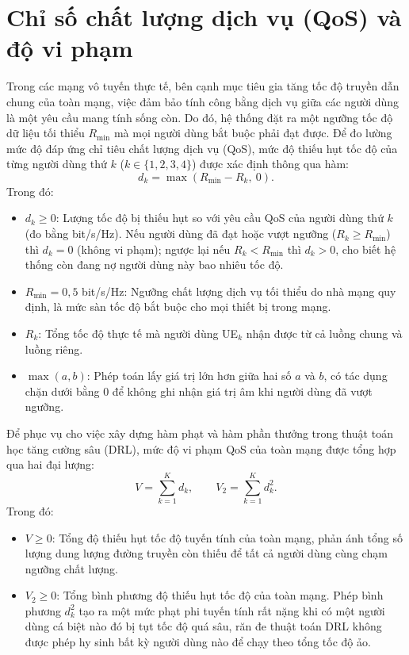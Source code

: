 \section{Chỉ số chất lượng dịch vụ (QoS) và độ vi phạm}
\label{sec:qos}

Trong các mạng vô tuyến thực tế, bên cạnh mục tiêu gia tăng tốc độ truyền dẫn chung của toàn mạng, việc đảm
bảo tính công bằng dịch vụ giữa các người dùng là một yêu cầu mang tính sống còn. Do đó, hệ thống đặt ra một
ngưỡng tốc độ dữ liệu tối thiểu $R_{\min}$ mà mọi người dùng bắt buộc phải đạt được. Để đo lường mức độ đáp
ứng chỉ tiêu chất lượng dịch vụ (QoS), mức độ thiếu hụt tốc độ của từng người dùng thứ $k$
($k \in \{1, 2, 3, 4\}$) được xác định thông qua hàm:
\begin{equation}
d_k = \max(R_{\min} - R_k,\ 0) .
\label{eq:thieu-hut}
\end{equation}
Trong đó:
\begin{itemize}
\item $d_k \ge 0$: Lượng tốc độ bị thiếu hụt so với yêu cầu QoS của người dùng thứ $k$ (đo bằng bit/s/Hz).
  Nếu người dùng đã đạt hoặc vượt ngưỡng ($R_k \ge R_{\min}$) thì $d_k = 0$ (không vi phạm); ngược lại nếu
  $R_k < R_{\min}$ thì $d_k > 0$, cho biết hệ thống còn đang nợ người dùng này bao nhiêu tốc độ.
\item $R_{\min} = 0,5$ bit/s/Hz: Ngưỡng chất lượng dịch vụ tối thiểu do nhà mạng quy định, là mức sàn tốc độ
  bắt buộc cho mọi thiết bị trong mạng.
\item $R_k$: Tổng tốc độ thực tế mà người dùng UE$_k$ nhận được từ cả luồng chung và luồng riêng.
\item $\max(a, b)$: Phép toán lấy giá trị lớn hơn giữa hai số $a$ và $b$, có tác dụng chặn dưới bằng 0 để
  không ghi nhận giá trị âm khi người dùng đã vượt ngưỡng.
\end{itemize}
Để phục vụ cho việc xây dựng hàm phạt và hàm phần thưởng trong thuật toán học tăng cường sâu (DRL), mức độ
vi phạm QoS của toàn mạng được tổng hợp qua hai đại lượng:
\begin{equation}
V = \sum_{k=1}^{K} d_k, \qquad V_2 = \sum_{k=1}^{K} d_k^2 .
\label{eq:vi-pham}
\end{equation}
Trong đó:
\begin{itemize}
\item $V \ge 0$: Tổng độ thiếu hụt tốc độ tuyến tính của toàn mạng, phản ánh tổng số lượng dung lượng đường
  truyền còn thiếu để tất cả người dùng cùng chạm ngưỡng chất lượng.
\item $V_2 \ge 0$: Tổng bình phương độ thiếu hụt tốc độ của toàn mạng. Phép bình phương $d_k^2$ tạo ra một mức
  phạt phi tuyến tính rất nặng khi có một người dùng cá biệt nào đó bị tụt tốc độ quá sâu, răn đe thuật toán
  DRL không được phép hy sinh bất kỳ người dùng nào để chạy theo tổng tốc độ ảo.
\end{itemize}

